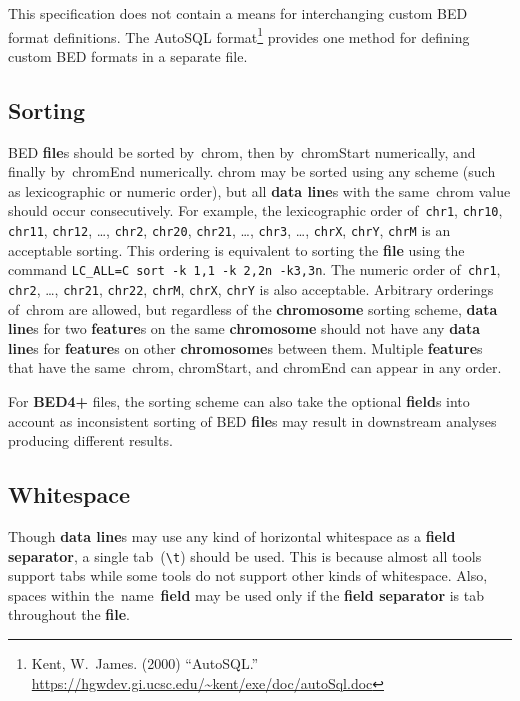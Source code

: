 \documentclass[11pt]{article}
\providecommand*{\Ac}[1]{\ac{#1}} %
\begin{document}
This specification does not contain a means for interchanging custom \ac{BED} format definitions.
The AutoSQL format\footnote{Kent, W.~James.
  (2000) ``AutoSQL.''
  \url{https://hgwdev.gi.ucsc.edu/~kent/exe/doc/autoSql.doc}} provides one method for defining custom \ac{BED} formats in a separate file.

\subsection{Sorting}
\Ac{BED} \textbf{file}s should be sorted by~\textsf{chrom}, then by~\textsf{chromStart} numerically, and finally by~\textsf{chromEnd} numerically.
\textsf{chrom} may be sorted using any scheme (such as lexicographic or numeric order), but all \textbf{data line}s with the same~\textsf{chrom} value should occur consecutively.
For example, the lexicographic order of~\texttt{chr1}, \texttt{chr10}, \texttt{chr11}, \texttt{chr12}, {\ldots}, \texttt{chr2}, \texttt{chr20}, \texttt{chr21}, {\ldots}, \texttt{chr3}, {\ldots}, \texttt{chrX}, \texttt{chrY}, \texttt{chrM} is an acceptable sorting.
This ordering is equivalent to sorting the \textbf{file} using the command \texttt{LC\_ALL=C~sort~-k~1,1~-k~2,2n~-k3,3n}.
The numeric order of~\texttt{chr1}, \texttt{chr2}, {\ldots}, \texttt{chr21}, \texttt{chr22}, \texttt{chrM}, \texttt{chrX}, \texttt{chrY} is also acceptable.
Arbitrary orderings of~\textsf{chrom} are allowed, but regardless of the \textbf{chromosome} sorting scheme, \textbf{data line}s for two \textbf{feature}s on the same \textbf{chromosome} should not have any \textbf{data line}s for \textbf{feature}s on other \textbf{chromosome}s between them.
Multiple \textbf{feature}s that have the same~\textsf{chrom}, \textsf{chromStart}, and \textsf{chromEnd} can appear in any order.

For \textbf{BED4+} files, the sorting scheme can also take the optional \textbf{field}s into account as inconsistent sorting of \ac{BED} \textbf{file}s may result in downstream analyses producing different results.

\subsection{Whitespace}\label{sec:whitespace}
Though \textbf{data line}s may use any kind of horizontal whitespace as a \textbf{field separator}, a single tab~(\texttt{{\textbackslash}t}) should be used.
This is because almost all tools support tabs while some tools do not support other kinds of whitespace.
Also, spaces within the~\textsf{name}~\textbf{field} may be used only if the \textbf{field separator} is tab throughout the \textbf{file}.
\end{document}
